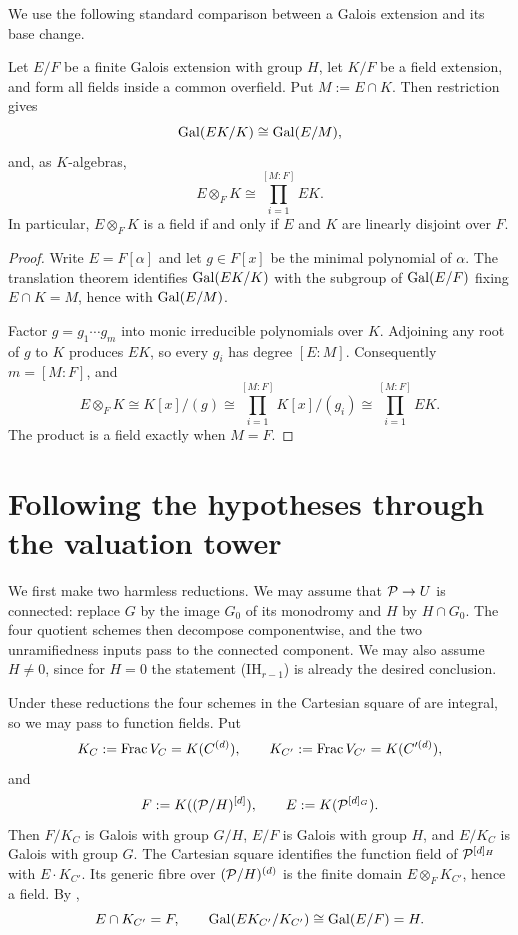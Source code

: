 We use the following standard comparison between a Galois extension and its
base change.

\begin{lemma}\label{lem:galois-base-change}
Let $E/F$ be a finite Galois extension with group $H$, let $K/F$ be a field
extension, and form all fields inside a common overfield. Put $M:=E\cap K$.
Then restriction gives
\[
\operatorname{Gal}(EK/K)\cong\operatorname{Gal}(E/M),
\]
and, as $K$-algebras,
\[
E\otimes_FK\cong\prod_{i=1}^{[M:F]}EK.
\]
In particular, $E\otimes_FK$ is a field if and only if $E$ and $K$ are
linearly disjoint over $F$.
\end{lemma}

\begin{proof}
Write $E=F[\alpha]$ and let $g\in F[x]$ be the minimal polynomial of
$\alpha$. The translation theorem identifies $\operatorname{Gal}(EK/K)$ with the subgroup
of $\operatorname{Gal}(E/F)$ fixing $E\cap K=M$, hence with $\operatorname{Gal}(E/M)$.

Factor $g=g_1\cdots g_m$ into monic irreducible polynomials over $K$.
Adjoining any root of $g$ to $K$ produces $EK$, so every $g_i$ has degree
$[E:M]$. Consequently $m=[M:F]$, and
\[
E\otimes_FK\cong K[x]/(g)
  \cong\prod_{i=1}^{[M:F]}K[x]/(g_i)
  \cong\prod_{i=1}^{[M:F]}EK.
\]
The product is a field exactly when $M=F$.
\end{proof}


\section{Following the hypotheses through the valuation tower}
\label{sec:as_induction_valuation_tower}

We first make two harmless reductions. We may assume that $\mathcal{P}\to U$ is
connected: replace $G$ by the image $G_0$ of its monodromy and $H$ by
$H\cap G_0$. The four quotient schemes then decompose componentwise, and the
two unramifiedness inputs pass to the connected component. We may also assume
$H\ne0$, since for $H=0$ the statement (IH$_{r-1}$) is already the desired
conclusion.

Under these reductions the four schemes in the Cartesian square of
 are integral, so we may pass to function
fields. Put
\[
K_C:=\operatorname{Frac} V_C=K(C^{(d)}),\qquad
K_{C'}:=\operatorname{Frac} V_{C'}=K(C'^{(d)}),
\]
and
\[
F:=K((\mathcal{P}/H)^{[d]}),\qquad
E:=K(\mathcal{P}^{[d]_G}).
\]
Then $F/K_C$ is Galois with group $G/H$, $E/F$ is Galois with group $H$,
and $E/K_C$ is Galois with group $G$. The Cartesian square identifies the
function field of $\mathcal{P}^{[d]_H}$ with $E\cdot K_{C'}$. Its generic fibre over
$(\mathcal{P}/H)^{(d)}$ is the finite domain $E\otimes_FK_{C'}$, hence a field.
By ,
\[
E\cap K_{C'}=F,
\qquad
\operatorname{Gal}(EK_{C'}/K_{C'})\cong\operatorname{Gal}(E/F)=H.
\]

